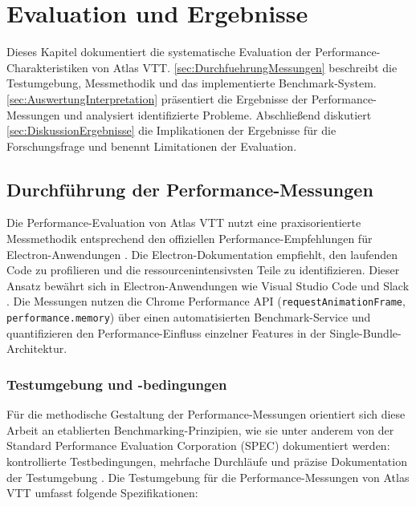 \chapter{Evaluation und Ergebnisse}
\label{sec:EvaluationErgebnisse}
\label{sec:evaluation}

Dieses Kapitel dokumentiert die systematische Evaluation der Performance-Charakteristiken von Atlas \ac{VTT}. \autoref{sec:DurchfuehrungMessungen} beschreibt die Testumgebung, Messmethodik und das implementierte Benchmark-System. \autoref{sec:AuswertungInterpretation} präsentiert die Ergebnisse der Performance-Messungen und analysiert identifizierte Probleme. Abschließend diskutiert \autoref{sec:DiskussionErgebnisse} die Implikationen der Ergebnisse für die Forschungsfrage und benennt Limitationen der Evaluation.

\section{Durchführung der Performance-Messungen}
\label{sec:DurchfuehrungMessungen}

Die Performance-Evaluation von Atlas \ac{VTT} nutzt eine praxisorientierte Messmethodik entsprechend den offiziellen Performance-Empfehlungen für Electron-Anwendungen \autocite{ElectronPerformanceGuide2024}. Die Electron-Dokumentation empfiehlt, den laufenden Code zu profilieren und die ressourcenintensivsten Teile zu identifizieren. Dieser Ansatz bewährt sich in Electron-Anwendungen wie Visual Studio Code und Slack \autocite{ElectronPerformanceGuide2024} . Die Messungen nutzen die Chrome Performance \ac{API} (\texttt{requestAnimationFrame}, \texttt{performance.memory}) über einen automatisierten Benchmark-Service und quantifizieren den Performance-Einfluss einzelner Features in der Single-Bundle-Architektur.

\subsection{Testumgebung und -bedingungen}

Für die methodische Gestaltung der Performance-Messungen orientiert sich diese Arbeit an etablierten Benchmarking-Prinzipien, wie sie unter anderem von der Standard Performance Evaluation Corporation (SPEC) dokumentiert werden: kontrollierte Testbedingungen, mehrfache Durchläufe und präzise Dokumentation der Testumgebung \autocite{SPECCPU2017RunRules}. Die Testumgebung für die Performance-Messungen von Atlas \ac{VTT} umfasst folgende Spezifikationen:

